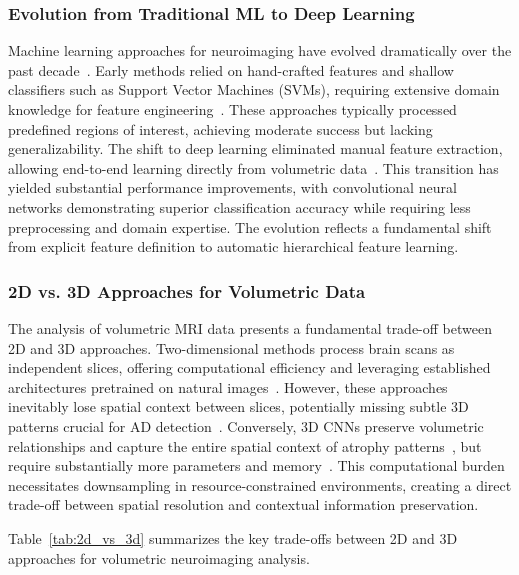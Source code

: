 \documentclass[12pt, a4paper]{article}
\begin{document}
\subsubsection{Evolution from Traditional ML to Deep Learning}

Machine learning approaches for neuroimaging have evolved dramatically over the past decade~\cite{bari2021comparative}. Early methods relied on hand-crafted features and shallow classifiers such as Support Vector Machines (SVMs), requiring extensive domain knowledge for feature engineering~\cite{cuingnet2011automatic}. These approaches typically processed predefined regions of interest, achieving moderate success but lacking generalizability. The shift to deep learning eliminated manual feature extraction, allowing end-to-end learning directly from volumetric data~\cite{litjens2017survey}. This transition has yielded substantial performance improvements, with convolutional neural networks demonstrating superior classification accuracy while requiring less preprocessing and domain expertise. The evolution reflects a fundamental shift from explicit feature definition to automatic hierarchical feature learning.

\subsubsection{2D vs. 3D Approaches for Volumetric Data}

The analysis of volumetric MRI data presents a fundamental trade-off between 2D and 3D approaches. Two-dimensional methods process brain scans as independent slices, offering computational efficiency and leveraging established architectures pretrained on natural images~\cite{liang2021alzheimer, sarraf2016classification}. However, these approaches inevitably lose spatial context between slices, potentially missing subtle 3D patterns crucial for AD detection~\cite{gunawardena2017applying}. Conversely, 3D CNNs preserve volumetric relationships and capture the entire spatial context of atrophy patterns~\cite{payan2015predicting}, but require substantially more parameters and memory~\cite{yang2021reinventing}. This computational burden necessitates downsampling in resource-constrained environments, creating a direct trade-off between spatial resolution and contextual information preservation.

Table~\ref{tab:2d_vs_3d} summarizes the key trade-offs between 2D and 3D approaches for volumetric neuroimaging analysis.
\end{document}
